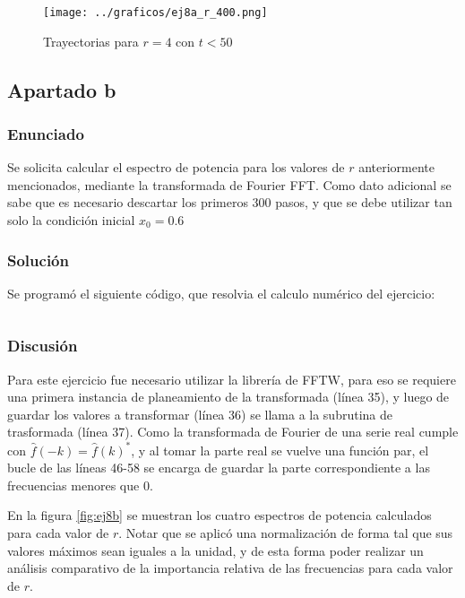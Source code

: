 \documentclass[a4paper,10pt]{paper}
\begin{document}
\begin{figure}[H]
 \centering
 \texttt{[image: ../graficos/ej8a\_r\_400.png]}
 \caption{Trayectorias para $r=4$ con $t<50$}
 \label{fig:ej8a_r_400}
\end{figure}

\subsection{Apartado b}
\subsubsection{Enunciado}
Se solicita calcular el espectro de potencia para los valores de $r$ anteriormente mencionados, mediante 
la transformada de Fourier FFT. Como dato adicional se sabe que es necesario descartar los primeros 300 
pasos, y que se debe utilizar tan solo la condici\'on inicial $x_0 = 0.6$ 

\subsubsection{Soluci\'on}
Se program\'o el siguiente c\'odigo, que resolvia el calculo num\'erico del ejercicio:
\inputminted[firstline=16, linenos, firstnumber=1]{fortran}{../8/ej8b.f90}

\subsubsection{Discusi\'on}
Para este ejercicio fue necesario utilizar la librer\'{i}a de FFTW, para eso se requiere una primera
instancia de planeamiento de la transformada (l\'{i}nea 35), y luego de guardar los valores a transformar
(l\'{i}nea 36) se llama a la subrutina de trasformada (l\'{i}nea 37). Como la transformada de Fourier de una
serie real cumple con $\hat{f}(-k) = \hat{f}(k)^*$, y al tomar la parte real se vuelve una funci\'on par, 
el bucle de las l\'{i}neas 46-58 se encarga de guardar la parte correspondiente a las frecuencias menores que $0$.

En la figura \ref{fig:ej8b} se muestran los cuatro espectros de potencia calculados para cada valor de $r$.
Notar que se aplic\'o una normalizaci\'on de forma tal que sus valores m\'aximos sean iguales a la unidad, y de 
esta forma poder realizar un an\'alisis comparativo de la importancia relativa de las frecuencias para cada valor
de $r$. 
\end{document}
